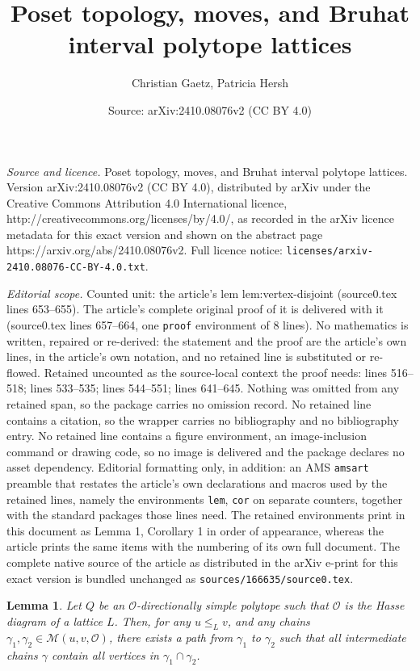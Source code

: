 \documentclass[10pt,a4paper]{amsart}
\title{Poset topology, moves, and Bruhat interval polytope lattices}
\author{Christian Gaetz, Patricia Hersh}
\date{Source: arXiv:2410.08076v2 (CC BY 4.0)}
\newtheorem{lem}{Lemma}
\begin{document}
\maketitle

\noindent\emph{Source and licence.} Poset topology, moves, and Bruhat interval polytope lattices. Version arXiv:2410.08076v2 (CC BY 4.0), distributed by arXiv under the Creative Commons Attribution 4.0 International licence, http://creativecommons.org/licenses/by/4.0/, as recorded in the arXiv licence metadata for this exact version and shown on the abstract page https://arxiv.org/abs/2410.08076v2. Full licence notice: \texttt{licenses/arxiv-2410.08076-CC-BY-4.0.txt}.\par\smallskip

\noindent\textit{Editorial scope.} Counted unit: the article's lem lem:vertex-disjoint (source0.tex lines 653--655). The article's complete original proof of it is delivered with it (source0.tex lines 657--664, one \texttt{proof} environment of 8 lines). No mathematics is written, repaired or re-derived: the statement and the proof are the article's own lines, in the article's own notation, and no retained line is substituted or re-flowed.  Retained uncounted as the source-local context the proof needs: lines 516--518; lines 533--535; lines 544--551; lines 641--645.  Nothing was omitted from any retained span, so the package carries no omission record.  No retained line contains a citation, so the wrapper carries no bibliography and no bibliography entry.  No retained line contains a figure environment, an image-inclusion command or drawing code, so no image is delivered and the package declares no asset dependency.  Editorial formatting only, in addition: an AMS \texttt{amsart} preamble that restates the article's own declarations and macros used by the retained lines, namely the environments \texttt{lem}, \texttt{cor} on separate counters, together with the standard packages those lines need.  The retained environments print in this document as Lemma 1, Corollary 1 in order of appearance, whereas the article prints the same items with the numbering of its own full document.  The complete native source of the article as distributed in the arXiv e-print for this exact version is bundled unchanged as \texttt{sources/166635/source0.tex}.
\begin{lem}\label{lem:path-exists}
Let $Q$ be an $\mathcal{O}$-directionally simple polytope such that $\mathcal{O}$ is the Hasse diagram of a lattice $L$. Then, for any $u \leq_L v$, and any chains $\gamma_1,\gamma_2 \in \mathcal{M}(u,v,\mathcal{O})$, there exists a path from $\gamma_1$ to $\gamma_2$ such that all intermediate chains $\gamma$ contain all vertices in $\gamma_1 \cap \gamma_2$. 
\end{lem}
\end{document}
